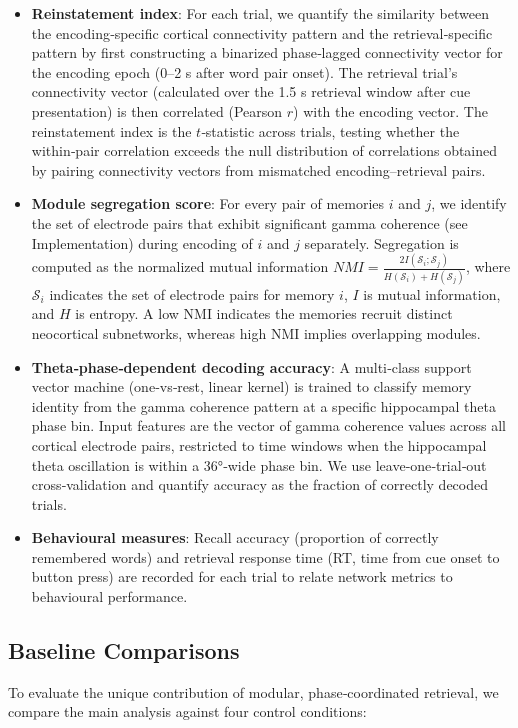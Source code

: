 \documentclass{article}
\begin{document}
\begin{itemize}
    \item \textbf{Reinstatement index}: For each trial, we quantify the similarity between the encoding‑specific cortical connectivity pattern and the retrieval‑specific pattern by first constructing a binarized phase‑lagged connectivity vector for the encoding epoch (0–2 s after word pair onset). The retrieval trial’s connectivity vector (calculated over the 1.5 s retrieval window after cue presentation) is then correlated (Pearson $r$) with the encoding vector. The reinstatement index is the $t$‑statistic across trials, testing whether the within‑pair correlation exceeds the null distribution of correlations obtained by pairing connectivity vectors from mismatched encoding–retrieval pairs.
    \item \textbf{Module segregation score}: For every pair of memories $i$ and $j$, we identify the set of electrode pairs that exhibit significant gamma coherence (see Implementation) during encoding of $i$ and $j$ separately. Segregation is computed as the normalized mutual information $NMI = \frac{2 I(\mathcal{S}_i; \mathcal{S}_j)}{H(\mathcal{S}_i)+H(\mathcal{S}_j)}$, where $\mathcal{S}_i$ indicates the set of electrode pairs for memory $i$, $I$ is mutual information, and $H$ is entropy. A low NMI indicates the memories recruit distinct neocortical subnetworks, whereas high NMI implies overlapping modules.
    \item \textbf{Theta‑phase‑dependent decoding accuracy}: A multi‑class support vector machine (one‑vs‑rest, linear kernel) is trained to classify memory identity from the gamma coherence pattern at a specific hippocampal theta phase bin. Input features are the vector of gamma coherence values across all cortical electrode pairs, restricted to time windows when the hippocampal theta oscillation is within a 36°‑wide phase bin. We use leave‑one‑trial‑out cross‑validation and quantify accuracy as the fraction of correctly decoded trials.
    \item \textbf{Behavioural measures}: Recall accuracy (proportion of correctly remembered words) and retrieval response time (RT, time from cue onset to button press) are recorded for each trial to relate network metrics to behavioural performance.
\end{itemize}

\subsection{Baseline Comparisons}
To evaluate the unique contribution of modular, phase‑coordinated retrieval, we compare the main analysis against four control conditions:
\end{document}
